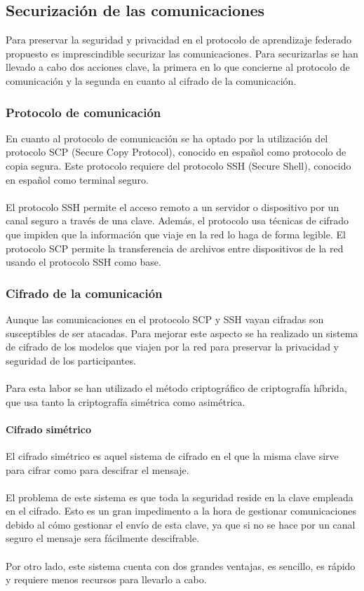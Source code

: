 \subsection{Securización de las comunicaciones} \label{SegCom}
Para preservar la seguridad y privacidad en el protocolo de aprendizaje federado propuesto es imprescindible securizar las comunicaciones. Para securizarlas se han llevado a cabo dos acciones clave, la primera en lo que concierne al protocolo de comunicación y la segunda en cuanto al cifrado de la comunicación.

\subsubsection{Protocolo de comunicación}
En cuanto al protocolo de comunicación se ha optado por la utilización del protocolo SCP (Secure Copy Protocol), conocido en español como protocolo de copia segura. Este protocolo requiere del protocolo SSH (Secure Shell), conocido en español como terminal seguro.
\\ \\
El protocolo SSH permite el acceso remoto a un servidor o dispositivo por un canal seguro a través de una clave. Además, el protocolo usa técnicas de cifrado que impiden que la información que viaje en la red lo haga de forma legible. El protocolo SCP permite la transferencia de archivos entre dispositivos de la red usando el protocolo SSH como base.

\subsubsection{Cifrado de la comunicación}
Aunque las comunicaciones en el protocolo SCP y SSH vayan cifradas son susceptibles de ser atacadas. Para mejorar este aspecto se ha realizado un sistema de cifrado de los modelos que viajen por la red para preservar la privacidad y seguridad de los participantes.
\\ \\ 
Para esta labor se han utilizado el método criptográfico de criptografía híbrida, que usa tanto la criptografía simétrica como asimétrica.

\paragraph{Cifrado simétrico} 
El cifrado simétrico es aquel sistema de cifrado en el que la misma clave sirve para cifrar como para descifrar el mensaje. 
\\ \\
El problema de este sistema es que toda la seguridad reside en la clave empleada en el cifrado. Esto es un gran impedimento a la hora de gestionar comunicaciones debido al cómo gestionar el envío de esta clave, ya que si no se hace por un canal seguro el mensaje sera fácilmente descifrable.
\\ \\
Por otro lado, este sistema cuenta con dos grandes ventajas, es sencillo, es rápido y requiere menos recursos para llevarlo a cabo.


